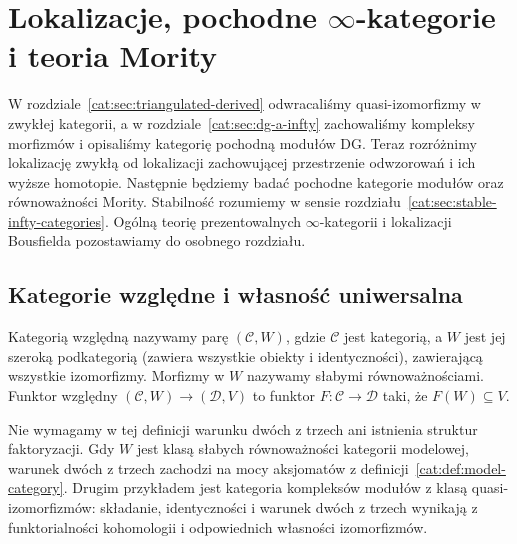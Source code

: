 \section{Lokalizacje, pochodne \texorpdfstring{$\infty$-kategorie}{kategorie wyższe} i teoria Mority}\label{cat:sec:derived-localization-morita}

W rozdziale~\ref{cat:sec:triangulated-derived} odwracaliśmy quasi-izomorfizmy w zwykłej kategorii, a w rozdziale~\ref{cat:sec:dg-a-infty} zachowaliśmy kompleksy morfizmów i opisaliśmy kategorię pochodną modułów DG. Teraz rozróżnimy lokalizację zwykłą od lokalizacji zachowującej przestrzenie odwzorowań i ich wyższe homotopie. Następnie będziemy badać pochodne kategorie modułów oraz równoważności Mority. Stabilność rozumiemy w sensie rozdziału~\ref{cat:sec:stable-infty-categories}. Ogólną teorię prezentowalnych $\infty$-kategorii i lokalizacji Bousfielda pozostawiamy do osobnego rozdziału.

\subsection{Kategorie względne i własność uniwersalna}

\begin{definicja}\label{cat:def:relative-category}
Kategorią względną nazywamy parę $(\mathcal C,W)$, gdzie $\mathcal C$ jest kategorią, a $W$ jest jej szeroką podkategorią (zawiera wszystkie obiekty i identyczności), zawierającą wszystkie izomorfizmy. Morfizmy w $W$ nazywamy słabymi równoważnościami. Funktor względny $(\mathcal C,W)\to(\mathcal D,V)$ to funktor $F:\mathcal C\to\mathcal D$ taki, że $F(W)\subseteq V$.
\end{definicja}

Nie wymagamy w tej definicji warunku dwóch z trzech ani istnienia struktur faktoryzacji. Gdy $W$ jest klasą słabych równoważności kategorii modelowej, warunek dwóch z trzech zachodzi na mocy aksjomatów z definicji~\ref{cat:def:model-category}. Drugim przykładem jest kategoria kompleksów modułów z klasą quasi-izomorfizmów: składanie, identyczności i warunek dwóch z trzech wynikają z funktorialności kohomologii i odpowiednich własności izomorfizmów.


